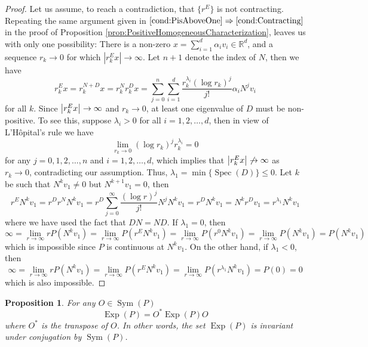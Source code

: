 \documentclass[11pt]{article}
\newtheorem{proposition}[theorem]{Proposition}
\theoremstyle{remark}
\newcommand\Sym{\operatorname{Sym}}
\newcommand\Exp{\operatorname{Exp}}
\newcommand\Spec{\operatorname{Spec}}
\newcommand{\f}[2]{\frac{#1}{#2}}
\begin{document}
\begin{proof}
Let us assume, to reach a contradiction, 
that $\{ r^E \}$ is not contracting. Repeating the same argument given in $\ref{cond:PisAboveOne}\Rightarrow\ref{cond:Contracting}$ in the proof of Proposition \ref{prop:PositiveHomogeneousCharacterization}, leaves us with only one possibility: There is a non-zero $x = \sum^d_{i=1}\alpha_i v_i \in\mathbb{R}^d$, and a sequence $r_k\to 0$ for which $|r_k^E x|\to\infty$. Let $n+1$ denote the index of $N$, then we have
\begin{equation*}
r^E_k x = r_k^{N+D} x 
= r_k^N r_k^D x 
= \sum_{j=0}^n\sum_{i=1}^d \f{r_k^{\lambda_i}(\log r_k)^j}{j!}   \alpha_iN^j v_i
\end{equation*}
for all $k$. Since $\abs{r_k^E x} \to \infty$ and $r_k \to 0$, at least one eigenvalue of $D$ must be non-positive. To see this, suppose $\lambda_i > 0$ for all $i = 1,2,\dots,d$, then in view of L'H\^{o}pital's rule we have
\begin{equation*}
    \lim_{r_k \to 0}(\log r_k)^j r_k^{\lambda_i} = 0  
\end{equation*}
for any $j =0, 1,2,\dots,n$ and $i =1,2,\dots,d$, which implies that $\abs{r^E_k x} \not\to \infty$ as $r_k \to 0$, contradicting our assumption. Thus, $\lambda_1 = \min\{ \Spec(D)\} \leq 0$. Let $k$ be such that $N^k v_1 \neq 0$ but $N^{k+1} v_1 = 0$, then
\begin{equation*}
    r^E N^k v_1 = r^D r^N N^k v_1 = r^D \sum_{j=0}^\infty \f{(\log r)^j}{j!}N^j N^k v_1 = r^D N^k v_1 = N^k r^D  v_1 =  r^{\lambda_{1}} N^k  v_1
\end{equation*}
where we have used the fact that $DN = ND$. If $\lambda_1= 0$, then 
\begin{equation*}
    \infty =  \lim_{r\to \infty} rP(N^k v_1)  = \lim_{r\to \infty} P( r^E N^k v_1) =  \lim_{r\to \infty}P(r^{0} N^k v_1)= \lim_{r\to \infty}P( N^k v_1) = P(N^k v_1)
\end{equation*}
which is impossible since $P$ is continuous at $N^k v_1$. On the other hand, if $\lambda_1 < 0$, then
\begin{equation*}
    \infty = \lim_{r\to \infty} rP(N^k v_1) = \lim_{r\to \infty} P(r^E N^k v_1) = \lim_{r\to \infty}P(r^{\lambda_1} N^k v_1) = P(0) = 0
\end{equation*}
which is also impossible. 
\end{proof}

\begin{proposition}\label{prop:ExpP}
For any  $O \in \Sym{(P)} $
\begin{equation*}
    \Exp(P) = O^* \Exp(P) O
\end{equation*}
where $O^*$ is the transpose of $O$. In other words, the set $\Exp(P)$ is invariant under conjugation by $\Sym(P)$.
\end{proposition}
\end{document}
